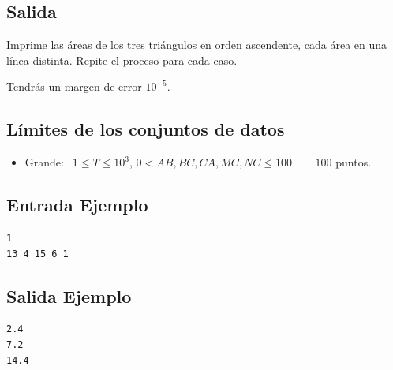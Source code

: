 \subsection*{Salida}
Imprime las áreas de los tres triángulos en orden 
ascendente, cada área en una línea distinta. Repite
el proceso para cada caso.

Tendrás un margen de error $10^{-5}$.



\subsection*{Límites de los conjuntos de datos}

\begin{itemize}
    \item Grande: $ \;\, 1 \leq T \leq 10^{3}$, 
    $0 < AB, BC, CA, MC, NC \leq 100$ $\quad \;\,$ $100$ puntos.
\end{itemize}



\begin{multicols}{2}

\subsection*{Entrada Ejemplo}

\begin{verbatim}
1
13 4 15 6 1
\end{verbatim}

\columnbreak

\subsection*{Salida Ejemplo}

\begin{verbatim}
2.4
7.2
14.4
\end{verbatim}

\end{multicols}